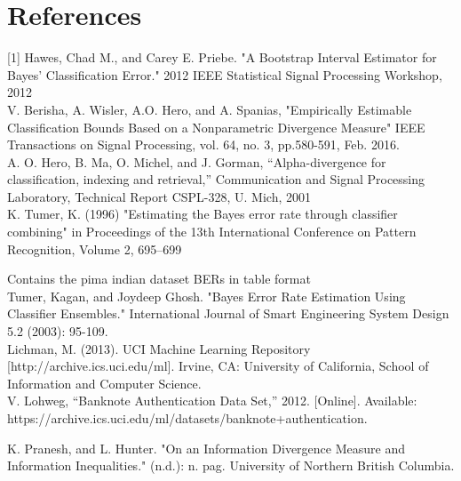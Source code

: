 \documentclass{article}
\begin{document}
		\section*{References}
		[1] Hawes, Chad M., and Carey E. Priebe. "A Bootstrap Interval Estimator for Bayes' Classification Error." 2012 IEEE Statistical Signal Processing Workshop, 2012
		\\ [0.5ex]
		\noindent[2] V. Berisha, A. Wisler, A.O. Hero, and A. Spanias, "Empirically Estimable Classification Bounds Based on a Nonparametric Divergence Measure" IEEE Transactions on Signal Processing, vol. 64, no. 3, pp.580-591, Feb. 2016.
		\\ [0.5ex]
		\noindent[3] A. O. Hero, B. Ma, O. Michel, and J. Gorman, “Alpha-divergence for classification, indexing and retrieval,” Communication and Signal Processing Laboratory, Technical Report CSPL-328, U. Mich, 2001
		\\ [0.5ex]
		\noindent [4] K. Tumer, K. (1996) "Estimating the Bayes error rate through classifier combining" in Proceedings of the 13th International Conference on Pattern Recognition, Volume 2, 695–699
		
		Contains the pima indian dataset BERs in table format
		\\ [0.5ex]
		\noindent[5] Tumer, Kagan, and Joydeep Ghosh. "Bayes Error Rate Estimation Using Classifier Ensembles." International Journal of Smart Engineering System Design 5.2 (2003): 95-109.
		\\ [0.5ex]
		
		\noindent[6] Lichman, M. (2013). UCI Machine Learning Repository [http://archive.ics.uci.edu/ml]. Irvine, CA: University of California, School of Information and Computer Science.
		\\ [0.5ex]
		
		\noindent [7] V. Lohweg, “Banknote Authentication Data Set,” 2012. [Online]. Available: https://archive.ics.uci.edu/ml/datasets/banknote+authentication.
	
		\noindent [8] K. Pranesh, and L. Hunter. "On an Information Divergence Measure and Information Inequalities." (n.d.): n. pag. University of Northern British Columbia. 
\end{document}
